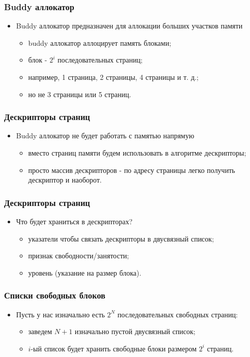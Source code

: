 \begin{frame}
\frametitle{Buddy аллокатор}
\begin{itemize}
    \item<1->Buddy аллокатор предназначен для аллокации больших участков памяти
    \begin{itemize}
        \item<2->buddy аллокатор аллоцирует память блоками;
        \item<3->блок - $2^i$ последовательных страниц;
        \item<4->например, 1 страница, 2 страницы, 4 страницы и т. д.;
	\item<4->но не 3 страницы или 5 страниц.
    \end{itemize}
\end{itemize}
\end{frame}

\begin{frame}
\frametitle{Дескрипторы страниц}
\begin{itemize}
    \item<1->Buddy аллокатор не будет работать с памятью напрямую
    \begin{itemize}
        \item<2->вместо страниц памяти будем использовать в алгоритме
        дескрипторы;
        \item<3->просто массив дескрипторов - по адресу страницы легко получить
        дескриптор и наоборот.
    \end{itemize}
\end{itemize}
\end{frame}

\begin{frame}
\frametitle{Дескрипторы страниц}
\begin{itemize}
    \item<1->Что будет храниться в дескрипторах?
    \begin{itemize}
        \item<2->указатели чтобы связать дескрипторы в двусвязный список;
        \item<3->признак свободности/занятости;
        \item<4->уровень (указание на размер блока).
    \end{itemize}
\end{itemize}
\end{frame}

\begin{frame}
\frametitle{Списки свободных блоков}
\begin{itemize}
    \item<1->Пусть у нас изначально есть $2^N$ последовательных свободных
    страниц:
    \begin{itemize}
        \item<1->заведем $N + 1$ изначально пустой двусвязный список;
        \item<1->$i$-ый список будет хранить свободные блоки размером $2^i$
        страниц.
    \end{itemize}
\end{itemize}
\end{frame}

